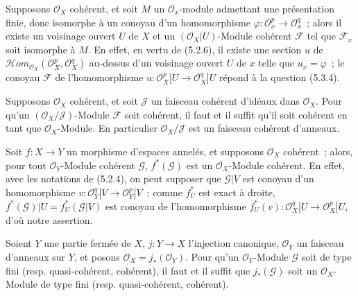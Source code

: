 \begin{env}[5.3.9]
\label{0.5.3.9-fr}
Supposons $\mathcal{O}_X$ cohérent, et soit $M$ un $\mathcal{O}_x$-module
admettant une présentation finie, donc isomorphe à un conoyau d'un
homomorphisme $\varphi:\mathcal{O}_x^p\to\mathcal{O}_x^q$~; alors il existe un
voisinage ouvert $U$ de $X$ et un $(\mathcal{O}_X|U)$-Module cohérent
$\mathcal{F}$ tel que $\mathcal{F}_x$ soit isomorphe à $M$. En effet, en vertu
de (5.2.6), il existe une section $u$ de
$\mathcal{H}\!om_{\mathcal{O}_X}(\mathcal{O}_X^p,\mathcal{O}_X^q)$ au-dessus
d'un voisinage ouvert $U$ de $x$ telle que $u_x=\varphi$~; le conoyau
$\mathcal{F}$ de l'homomorphisme
$u:\mathcal{O}_X^p|U\to\mathcal{O}_X^q|U$ répond à la question (5.3.4).
\end{env}

\begin{env}[5.3.10]
\label{0.5.3.10-fr}
Supposons $\mathcal{O}_X$ cohérent, et soit $\mathcal{J}$ un faisceau cohérent
d'idéaux dans $\mathcal{O}_X$. Pour qu'un
$(\mathcal{O}_X/\mathcal{J})$-Module $\mathcal{F}$ soit cohérent, il faut et il
suffit qu'il soit cohérent en tant que $\mathcal{O}_X$-Module. En particulier
$\mathcal{O}_X/\mathcal{J}$ est un faisceau cohérent d'anneaux.
\end{env}

\begin{env}[5.3.11]
\label{0.5.3.11-fr}
Soit $f:X\to Y$ un morphisme d'espaces annelés, et supposons
$\mathcal{O}_X$ cohérent~; alors, pour tout $\mathcal{O}_Y$-Module cohérent
$\mathcal{G}$, $f^*(\mathcal{G})$ est un $\mathcal{O}_X$-Module cohérent. En
effet, avec les notations de (5.2.4), on peut supposer que $\mathcal{G}|V$ est
conoyau d'un homomorphisme
$v:\mathcal{O}_Y^q|V\to\mathcal{O}_Y^p|V$~; comme $f_U^*$ est exact à droite,
$f^*(\mathcal{G})|U=f_U^*(\mathcal{G}|V)$ est conoyau de l'homomorphisme
$f_U^*(v):\mathcal{O}_X^q|U\to\mathcal{O}_X^p|U$, d'où notre assertion.
\end{env}

\begin{env}[5.3.12]
\label{0.5.3.12-fr}
Soient $Y$ une partie fermée de $X$, $j:Y\to X$ l'injection canonique,
$\mathcal{O}_Y$ un faisceau d'anneaux sur $Y$, et posons
$\mathcal{O}_X=j_*(\mathcal{O}_Y)$. Pour qu'un $\mathcal{O}_Y$-Module
$\mathcal{G}$ soit de type fini (resp. quasi-cohérent, cohérent), il faut et il
suffit que $j_*(\mathcal{G})$ soit un $\mathcal{O}_X$-Module de type fini
(resp. quasi-cohérent, cohérent).
\end{env}

